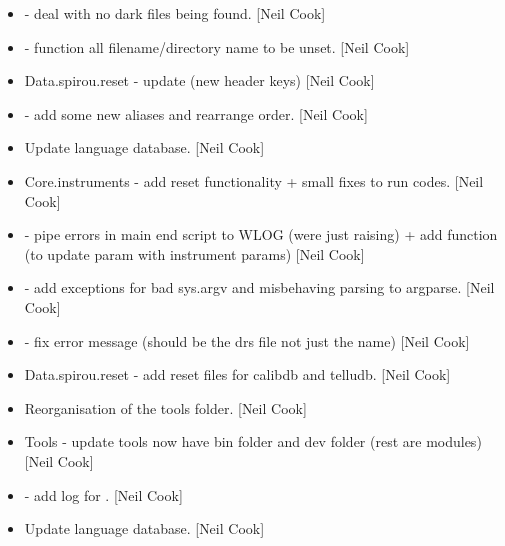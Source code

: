 \documentclass[a4paper,10pt,english]{report}
\begin{document}
\begin{itemize}
\item {} 
 - deal with no dark files being found. {[}Neil
Cook{]}

\item {} 
 -  function all filename/directory name
to be unset. {[}Neil Cook{]}

\item {} 
Data.spirou.reset - update  (new header keys) {[}Neil
Cook{]}

\item {} 
 - add some new aliases and rearrange order. {[}Neil
Cook{]}

\item {} 
Update language database. {[}Neil Cook{]}

\item {} 
Core.instruments - add reset functionality + small fixes to run codes.
{[}Neil Cook{]}

\item {} 
 - pipe errors in main end script to WLOG
(were just raising) + add function  (to update param with
instrument params) {[}Neil Cook{]}

\item {} 
 - add exceptions for bad sys.argv and
misbehaving parsing to argparse. {[}Neil Cook{]}

\item {} 
 - fix error message (should be the drs file not
just the name) {[}Neil Cook{]}

\item {} 
Data.spirou.reset - add reset files for calibdb and telludb. {[}Neil
Cook{]}

\item {} 
Reorganisation of the tools folder. {[}Neil Cook{]}

\item {} 
Tools - update tools now have bin folder and dev folder (rest are
modules) {[}Neil Cook{]}

\item {} 
 - add log for . {[}Neil Cook{]}

\item {} 
Update language database. {[}Neil Cook{]}


\end{itemize}
\end{document}
